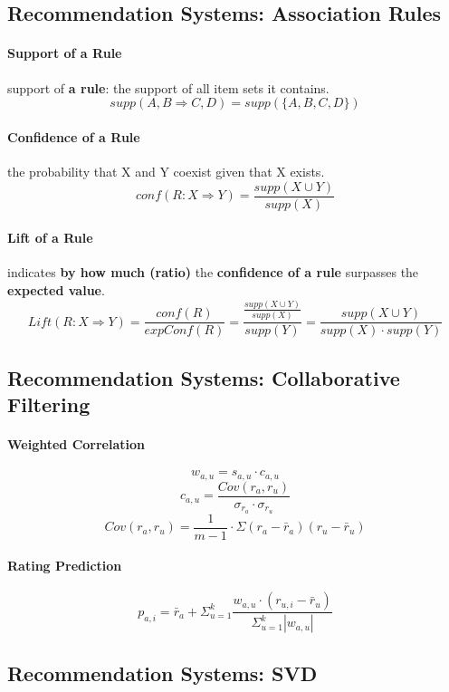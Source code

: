 \subsection{Recommendation Systems: Association Rules}
\paragraph{Support of a Rule}
\item support of \textbf{a rule}: the support of all item sets it contains. 
$$supp(A,B \Rightarrow C,D) = supp(\{A,B,C,D\})$$

\paragraph{Confidence of a Rule}  the probability that X and Y coexist given that X exists.
$$conf(R: X \Rightarrow Y) = \frac{supp(X \cup Y)}{supp(X)}$$

\paragraph{Lift of a Rule} indicates \textbf{by how much (ratio)} the \textbf{confidence of a rule} surpasses the \textbf{expected value}. 
$$Lift(R: X \Rightarrow Y) = \frac{conf(R)}{expConf(R)} = \dfrac{\frac{supp(X \cup Y)}{supp(X)}}{supp(Y)} = \frac{supp(X \cup Y)}{supp(X)\cdot supp(Y)}$$
\subsection{Recommendation Systems: Collaborative Filtering}
\paragraph{Weighted Correlation}
$$w_{a,u} = s_{a,u} \cdot c_{a,u}$$ 
$$c_{a,u} = \frac{Cov(r_{a}, r_{u})}{\sigma_{r_{a}} \cdot \sigma_{r_{u}}}$$
$$Cov(r_{a}, r_{u}) = \frac{1}{m-1}\cdot \Sigma (r_a - \bar{r}_a) (r_u - \bar{r}_u)$$

\paragraph{Rating Prediction}
$$p_{a,i} = \bar{r}_a + \Sigma_{u = 1}^k \dfrac{w_{a,u} \cdot (r_{u,i} - \bar{r}_u)}{\Sigma_{u=1}^k |w_{a,u}|}$$

\subsection{Recommendation Systems: SVD}
